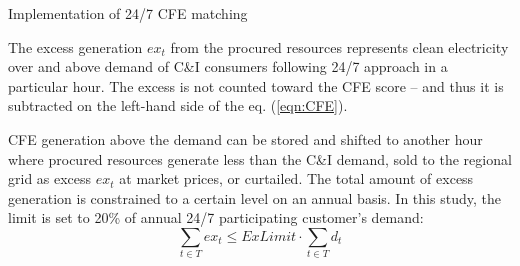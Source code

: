 \begin{frame}{Implementation of 24/7 CFE matching}

  {\small

  The excess generation $ex_t$ from the procured resources represents clean electricity over
  and above demand of C\&I consumers following 24/7 approach in a particular hour. 
  The \alert{excess is not counted toward the CFE score} -- 
  and thus it is subtracted on the left-hand side of the eq. (\ref{eqn:CFE}).

  CFE generation above the demand can be stored and shifted to another hour where procured resources 
  generate less than the C\&I demand, sold to the regional grid as excess $ex_t$
  at market prices, or curtailed. 
  The total amount of excess generation is constrained to a certain level on an annual basis. 
  In this study, the limit is set to 20\% of annual 24/7 participating customer's demand:
  \vspace{0.1cm}
  \begin{equation}
  \sum_{t\in T} ex_t \leq ExLimit \cdot \sum_{t\in T} d_t
  \label{eqn:excess}
  \end{equation}

  \noindent{}
  }

\end{frame}



